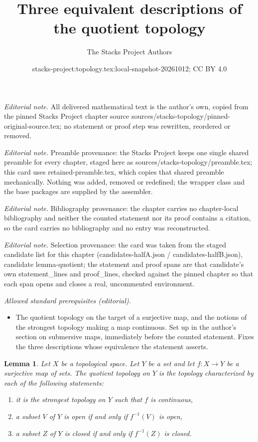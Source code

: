 \documentclass[10pt,a4paper]{amsart}
\title{Three equivalent descriptions of the quotient topology}
\author{The Stacks Project Authors}
\date{stacks-project:topology.tex:local-snapshot-20261012; CC BY 4.0}
\theoremstyle{plain}
\newtheorem{lemma}[subsection]{Lemma}
\theoremstyle{definition}
\theoremstyle{remark}
\numberwithin{equation}{subsection}
\begin{document}
\maketitle
\noindent\textit{Editorial note.} All delivered mathematical text is the author's own, copied from the pinned Stacks Project chapter source sources/stacks-topology/pinned-original-source.tex; no statement or proof step was rewritten, reordered or removed.\par\medskip
\noindent\textit{Editorial note.} Preamble provenance: the Stacks Project keeps one single shared preamble for every chapter, staged here as sources/stacks-topology/preamble.tex; this card uses retained-preamble.tex, which copies that shared preamble mechanically. Nothing was added, removed or redefined; the wrapper class and the base packages are supplied by the assembler.\par\medskip
\noindent\textit{Editorial note.} Bibliography provenance: the chapter carries no chapter-local bibliography and neither the counted statement nor its proof contains a citation, so the card carries no bibliography and no entry was reconstructed.\par\medskip
\noindent\textit{Editorial note.} Selection provenance: the card was taken from the staged candidate list for this chapter (candidates-halfA.json / candidates-halfB.json), candidate lemma-quotient; the statement and proof spans are that candidate's own statement\_lines and proof\_lines, checked against the pinned chapter so that each span opens and closes a real, uncommented environment.\par\medskip
\noindent\textit{Allowed standard prerequisites (editorial).}\begin{itemize}
\item The quotient topology on the target of a surjective map, and the notions of the strongest topology making a map continuous. Set up in the author's section on submersive maps, immediately before the counted statement. Fixes the three descriptions whose equivalence the statement asserts.
\end{itemize}\medskip
\begin{lemma}
\label{lemma-quotient}
Let $X$ be a topological space. Let $Y$ be a set and let $f : X \to Y$
be a surjective map of sets. The quotient topology on $Y$ is the
topology characterized by each of the following statements:
\begin{enumerate}
\item it is the strongest topology on $Y$ such that $f$ is continuous,
\item a subset $V$ of $Y$ is open if and only if $f^{-1}(V)$ is open,
\item a subset $Z$ of $Y$ is closed if and only if $f^{-1}(Z)$ is closed.
\end{enumerate}
\end{lemma}
\end{document}
